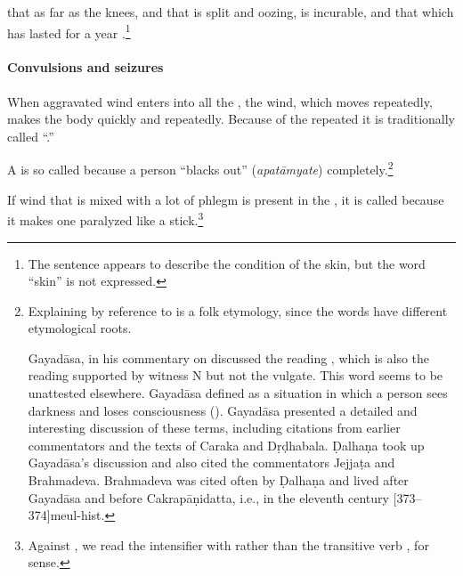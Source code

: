 \begin{translation}
\item[49ab, 50ab]

 that  as far as
the knees, and that is split and oozing, is incurable, and that which
has lasted for a year .\footnote{The
    sentence appears to describe the condition of the skin, but the word
    “skin” is not expressed.}
  
\paragraph{Convulsions and seizures}

\item[50cd--51]

When aggravated wind enters into all the , the
wind, which moves repeatedly, makes the body 
quickly and repeatedly. Because of the repeated
 it is traditionally called “.”


\item[52--56]

A  is so called because a person “blacks out”
(\emph{apatāmyate}) completely.\label{apatānaka}\footnote{\label{apatānaka-note}Explaining
     by reference to  is a folk etymology, since
    the words have different etymological roots.
    
 Gayadāsa, in his commentary on  discussed the reading
, which is also the  reading supported by witness N but not
the vulgate.  This word seems to be unattested elsewhere.  Gayadāsa
defined  as a situation in which a person sees darkness and
loses consciousness (). Gayadāsa presented a
detailed and interesting discussion of these terms, including citations
from earlier commentators and the texts of Caraka and Dṛḍhabala. Ḍalhaṇa
took up Gayadāsa's discussion and also cited the commentators Jejjaṭa and
Brahmadeva. Brahmadeva was cited often by Ḍalhaṇa and lived after Gayadāsa
and before Cakrapāṇidatta, i.e., in the eleventh century
[373--374]{meul-hist}.\label{Brahmadeva}}

\item[52cd--53ab] 

If wind that is mixed with a lot of phlegm is present in
the , it is called  because it makes one paralyzed like a stick.\footnote{Against
    , we read the intensifier  with 
     rather
    than the transitive verb , for sense.
    
}
\end{translation}
